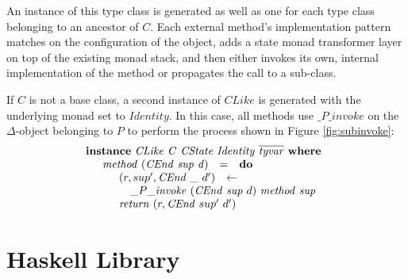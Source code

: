 An instance of this type class is generated as well as one for each type class belonging to an ancestor of $C$. Each external method's implementation pattern matches on the configuration of the object, adds a state monad transformer layer on top of the existing monad stack, and then either invokes its own, internal implementation of the method or propagates the call to a sub-class.

If $C$ is not a base class, a second instance of $\mathit{CLike}$ is generated with the underlying monad set to $\mathit{Identity}$. In this case, all methods use $\_P\_\mathit{invoke}$ on the $\Delta$-object belonging to $P$ to perform the process shown in Figure \ref{fig:subinvoke}:
\begin{displaymath}
\begin{array}{l}
\mathbf{instance}~\mathit{CLike}~\mathit{C}~\mathit{CState}~\mathit{Identity}~\overline{\mathit{tyvar}}~\mathbf{where}\\
\quad \begin{array}{lcl}
\mathit{method}~(\mathit{CEnd}~\mathit{sup}~\mathit{d}) & = & \mathbf{do} \\
\multicolumn{3}{l}{\quad \begin{array}{lcl}
    (r,sup',\mathit{CEnd}~\_~d') & \leftarrow & \\ 
    \multicolumn{3}{l}{ \quad \_P\_\mathit{invoke}~(\mathit{CEnd}~\mathit{sup}~d)~\mathit{method}~\mathit{sup} }\\
    \multicolumn{3}{l}{\mathit{return}~(r, \mathit{CEnd}~sup'~d')}
    \end{array}}
\end{array}
\end{array}
\end{displaymath}

\section{Haskell Library}
\label{sec:th}

